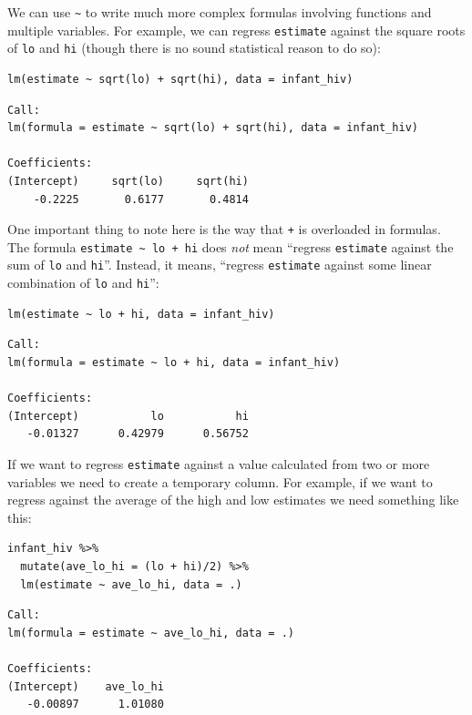 We can use \texttt{{\textasciitilde}} to write much more complex formulas involving functions and multiple variables.
For example,
we can regress \texttt{estimate} against the square roots of \texttt{lo} and \texttt{hi}
(though there is no sound statistical reason to do so):

\begin{lstlisting}
lm(estimate ~ sqrt(lo) + sqrt(hi), data = infant_hiv)
\end{lstlisting}

\begin{lstlisting}
Call:
lm(formula = estimate ~ sqrt(lo) + sqrt(hi), data = infant_hiv)

Coefficients:
(Intercept)     sqrt(lo)     sqrt(hi)  
    -0.2225       0.6177       0.4814  
\end{lstlisting}

One important thing to note here is the way that \texttt{+} is overloaded in formulas.
The formula \texttt{estimate {\textasciitilde} lo + hi} does \emph{not} mean
``regress \texttt{estimate} against the sum of \texttt{lo} and \texttt{hi}''.
Instead,
it means, ``regress \texttt{estimate} against some linear combination of \texttt{lo} and \texttt{hi}'':

\begin{lstlisting}
lm(estimate ~ lo + hi, data = infant_hiv)
\end{lstlisting}

\begin{lstlisting}
Call:
lm(formula = estimate ~ lo + hi, data = infant_hiv)

Coefficients:
(Intercept)           lo           hi  
   -0.01327      0.42979      0.56752  
\end{lstlisting}

If we want to regress \texttt{estimate} against a value calculated from two or more variables
we need to create a temporary column.
For example,
if we want to regress against the average of the high and low estimates
we need something like this:

\begin{lstlisting}
infant_hiv %>%
  mutate(ave_lo_hi = (lo + hi)/2) %>%
  lm(estimate ~ ave_lo_hi, data = .)
\end{lstlisting}

\begin{lstlisting}
Call:
lm(formula = estimate ~ ave_lo_hi, data = .)

Coefficients:
(Intercept)    ave_lo_hi  
   -0.00897      1.01080  
\end{lstlisting}

